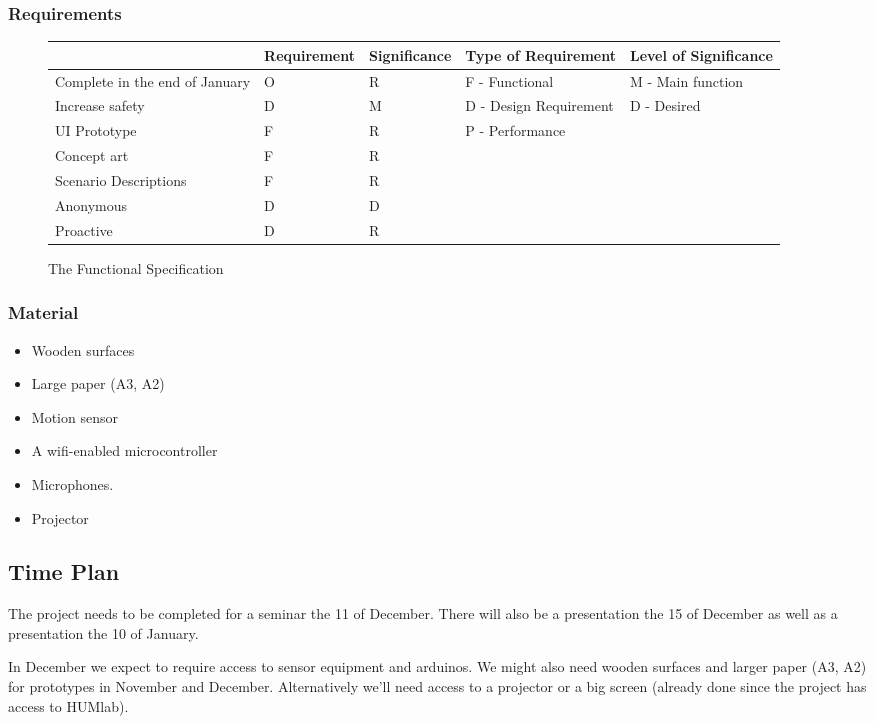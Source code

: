 \documentclass[twoside]{report}
\begin{document}
\subsubsection{Requirements}
\begin{figure}[H]
\caption{The Functional Specification}
\begin{tabular}{|p{2.5cm}|l|l|l|l|}
  \hline
  & Requirement & Significance & Type of Requirement & Level of Significance
  \\\hline
  Complete in the end of January & O & R & F - Functional & M - Main function
  \\\hline
  Increase safety & D & M & D - Design Requirement & D - Desired
  \\\hline
  UI Prototype & F & R & P - Performance &
  \\\hline
  Concept art & F & R &  & 
  \\\hline
  Scenario Descriptions & F & R &  &
  \\\hline
  Anonymous & D & D & &
  \\\hline
  Proactive & D & R & &
  \\\hline
\end{tabular}
\end{figure}

\subsubsection{Material}

\begin{itemize}
    \item Wooden surfaces 
    \item Large paper (A3, A2)
    \item Motion sensor 
    \item A wifi-enabled microcontroller 
    \item Microphones.
    \item Projector
\end{itemize}

\subsection{Time Plan}

The project needs to be completed for a seminar the 11 of December. There will
also be a presentation the 15 of December as well as a presentation the 10 of
January. 

In December we expect to require access to sensor equipment and arduinos. We
might also need wooden surfaces and larger paper (A3, A2) for prototypes in
November and December. Alternatively we’ll need access to a projector or a big
screen (already done since the project has access to HUMlab). 
\end{document}
